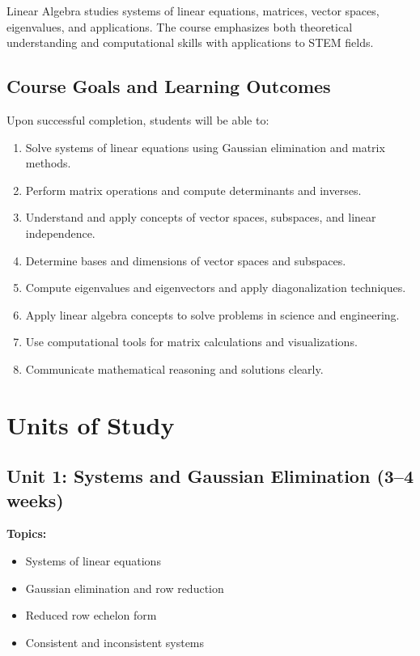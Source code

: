 \documentclass[12pt,oneside]{book}
\begin{document}
Linear Algebra studies systems of linear equations, matrices, vector spaces, eigenvalues, and applications. The course emphasizes both theoretical understanding and computational skills with applications to STEM fields.

\subsection{Course Goals and Learning Outcomes}

Upon successful completion, students will be able to:

\begin{enumerate}
    \item Solve systems of linear equations using Gaussian elimination and matrix methods.
    \item Perform matrix operations and compute determinants and inverses.
    \item Understand and apply concepts of vector spaces, subspaces, and linear independence.
    \item Determine bases and dimensions of vector spaces and subspaces.
    \item Compute eigenvalues and eigenvectors and apply diagonalization techniques.
    \item Apply linear algebra concepts to solve problems in science and engineering.
    \item Use computational tools for matrix calculations and visualizations.
    \item Communicate mathematical reasoning and solutions clearly.
\end{enumerate}


\section{Units of Study}

\subsection{Unit 1: Systems and Gaussian Elimination (3--4 weeks)}

\textbf{Topics:}
\begin{itemize}
    \item Systems of linear equations
    \item Gaussian elimination and row reduction
    \item Reduced row echelon form
    \item Consistent and inconsistent systems
\end{itemize}
\end{document}
